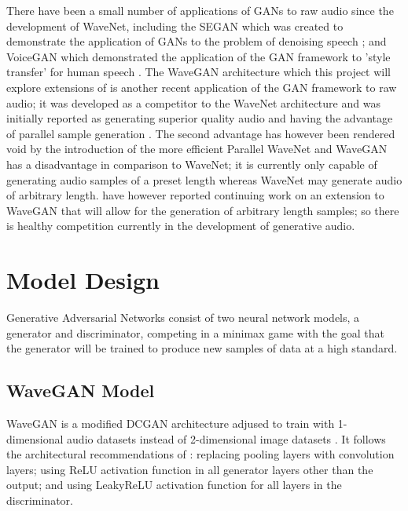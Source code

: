 \documentclass[a4paper, titlepage]{article}
\begin{document}
\newline
\newline
There have been a small number of applications of \ac{GAN}s to raw audio since the development of WaveNet, including the \ac{SEGAN} which was created to demonstrate the application of \ac{GAN}s to the problem of denoising speech \citep{2017arXiv170309452P}; and VoiceGAN which demonstrated the application of the \ac{GAN} framework to 'style transfer' for human speech \citep{2018arXiv180206840G}.
\newline
\newline
The WaveGAN architecture which this project will explore extensions of is another recent application of the \ac{GAN} framework to raw audio; it was developed as a competitor to the WaveNet architecture and was initially reported as generating superior quality audio and having the advantage of parallel sample generation \citeauthor{2018arXiv180204208D}.
\newline
\newline
The second advantage has however been rendered void by the introduction of the more efficient Parallel WaveNet and WaveGAN has a disadvantage in comparison to WaveNet; it is currently only capable of generating audio samples of a preset length whereas WaveNet may generate audio of arbitrary length.
\citeauthor{2018arXiv180204208D} have however reported continuing work on an extension to WaveGAN that will allow for the generation of arbitrary length samples; so there is healthy competition currently in the development of generative audio.

\newpage

\section{Model Design}

Generative Adversarial Networks consist of two neural network models, a generator and discriminator, competing in a minimax game with the goal that the generator will be trained to produce new samples of data at a high standard.

\subsection{WaveGAN Model}

WaveGAN is a modified \ac{DCGAN} architecture adjused to train with 1-dimensional audio datasets instead of 2-dimensional image datasets \citep{2015arXiv151106434R}.
It follows the architectural recommendations of \citeauthor{2015arXiv151106434R}: replacing pooling layers with convolution layers; using \ac{ReLU} activation function in all generator layers other than the output; and using LeakyReLU activation function for all layers in the discriminator.
\end{document}
